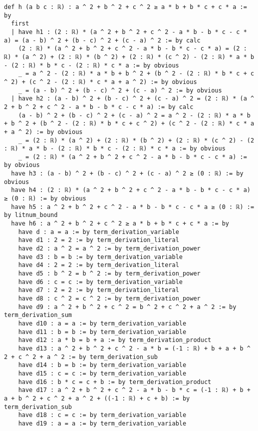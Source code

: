 \documentclass{article}
\begin{document}
\begin{tcolorbox}[colback=white!10, width=\linewidth]
\begin{lstlisting}[language=Lean4]
def h (a b c : ℝ) : a ^ 2 + b ^ 2 + c ^ 2 ≥ a * b + b * c + c * a := by
  first
  | have h1 : (2 : ℝ) * (a ^ 2 + b ^ 2 + c ^ 2 - a * b - b * c - c * a) = (a - b) ^ 2 + (b - c) ^ 2 + (c - a) ^ 2 := by calc
    (2 : ℝ) * (a ^ 2 + b ^ 2 + c ^ 2 - a * b - b * c - c * a) = (2 : ℝ) * (a ^ 2) + (2 : ℝ) * (b ^ 2) + (2 : ℝ) * (c ^ 2) - (2 : ℝ) * a * b - (2 : ℝ) * b * c - (2 : ℝ) * c * a := by obvious
    _ = a ^ 2 - (2 : ℝ) * a * b + b ^ 2 + (b ^ 2 - (2 : ℝ) * b * c + c ^ 2) + (c ^ 2 - (2 : ℝ) * c * a + a ^ 2) := by obvious
    _ = (a - b) ^ 2 + (b - c) ^ 2 + (c - a) ^ 2 := by obvious
  | have h2 : (a - b) ^ 2 + (b - c) ^ 2 + (c - a) ^ 2 = (2 : ℝ) * (a ^ 2 + b ^ 2 + c ^ 2 - a * b - b * c - c * a) := by calc
    (a - b) ^ 2 + (b - c) ^ 2 + (c - a) ^ 2 = a ^ 2 - (2 : ℝ) * a * b + b ^ 2 + (b ^ 2 - (2 : ℝ) * b * c + c ^ 2) + (c ^ 2 - (2 : ℝ) * c * a + a ^ 2) := by obvious
    _ = (2 : ℝ) * (a ^ 2) + (2 : ℝ) * (b ^ 2) + (2 : ℝ) * (c ^ 2) - (2 : ℝ) * a * b - (2 : ℝ) * b * c - (2 : ℝ) * c * a := by obvious
    _ = (2 : ℝ) * (a ^ 2 + b ^ 2 + c ^ 2 - a * b - b * c - c * a) := by obvious
  have h3 : (a - b) ^ 2 + (b - c) ^ 2 + (c - a) ^ 2 ≥ (0 : ℝ) := by obvious
  have h4 : (2 : ℝ) * (a ^ 2 + b ^ 2 + c ^ 2 - a * b - b * c - c * a) ≥ (0 : ℝ) := by obvious
  have h5 : a ^ 2 + b ^ 2 + c ^ 2 - a * b - b * c - c * a ≥ (0 : ℝ) := by litnum_bound
  have h6 : a ^ 2 + b ^ 2 + c ^ 2 ≥ a * b + b * c + c * a := by
    have d : a = a := by term_derivation_variable
    have d1 : 2 = 2 := by term_derivation_literal
    have d2 : a ^ 2 = a ^ 2 := by term_derivation_power
    have d3 : b = b := by term_derivation_variable
    have d4 : 2 = 2 := by term_derivation_literal
    have d5 : b ^ 2 = b ^ 2 := by term_derivation_power
    have d6 : c = c := by term_derivation_variable
    have d7 : 2 = 2 := by term_derivation_literal
    have d8 : c ^ 2 = c ^ 2 := by term_derivation_power
    have d9 : a ^ 2 + b ^ 2 + c ^ 2 = b ^ 2 + c ^ 2 + a ^ 2 := by term_derivation_sum
    have d10 : a = a := by term_derivation_variable
    have d11 : b = b := by term_derivation_variable
    have d12 : a * b = b + a := by term_derivation_product
    have d13 : a ^ 2 + b ^ 2 + c ^ 2 - a * b = (-1 : ℝ) + b + a + b ^ 2 + c ^ 2 + a ^ 2 := by term_derivation_sub
    have d14 : b = b := by term_derivation_variable
    have d15 : c = c := by term_derivation_variable
    have d16 : b * c = c + b := by term_derivation_product
    have d17 : a ^ 2 + b ^ 2 + c ^ 2 - a * b - b * c = (-1 : ℝ) + b + a + b ^ 2 + c ^ 2 + a ^ 2 + ((-1 : ℝ) + c + b) := by term_derivation_sub
    have d18 : c = c := by term_derivation_variable
    have d19 : a = a := by term_derivation_variable

\end{lstlisting}
\end{tcolorbox}
\end{document}
